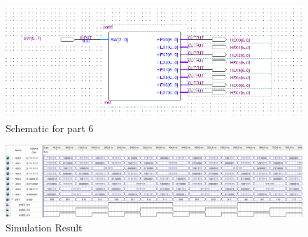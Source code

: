 \clearpage



\begin{figure}[h]
    \centering
    \includegraphics[width = \textwidth]{source/picture/Lab1/Lab1_6.png}
    \caption{Schematic for part 6}
\end{figure}

\begin{figure}[h]
    \centering
    \includegraphics[scale = 0.40]{source/picture/Lab1/Lab1_wave.png}
    \caption{Simulation Result}
\end{figure}